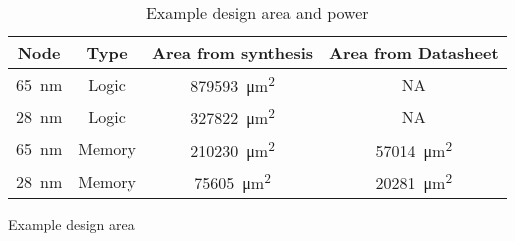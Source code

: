 \begin{table}[h]
    \begin{subtable}{0.65\textwidth}
        \vspace{5mm}
        \begin{adjustbox}{width=1\textwidth}
            \footnotesize
            \begin{tabular}{ |c|c|c|c|  }
              \hline
          Node  & Type      & Area from synthesis                                 & Area from Datasheet                                \\
              \hline
          \SI{65}{\nano\meter}  & Logic     & \SI[per-mode=symbol]{879593}{\square\micro\meter}  & NA\\ %
          \SI{28}{\nano\meter}  & Logic     & \SI[per-mode=symbol]{327822}{\square\micro\meter}  & NA\\ %
          \SI{65}{\nano\meter}  & Memory    & \SI[per-mode=symbol]{210230}{\square\micro\meter}  & \SI[per-mode=symbol]{57014}{\square\micro\meter}    \\
          \SI{28}{\nano\meter}  & Memory    & \SI[per-mode=symbol]{75605 }{\square\micro\meter}  & \SI[per-mode=symbol]{20281}{\square\micro\meter}    \\
              \hline
            \end{tabular}
        \end{adjustbox}
      \caption{Example design area}
      \label{tab:Example design area}
    \end{subtable}
  \captionsetup{justification=centering, skip=9pt}
  \vspace{0.0cm}
  \caption{Example design area and power}
  \label{tab:Scaling runs}
\end{table}

